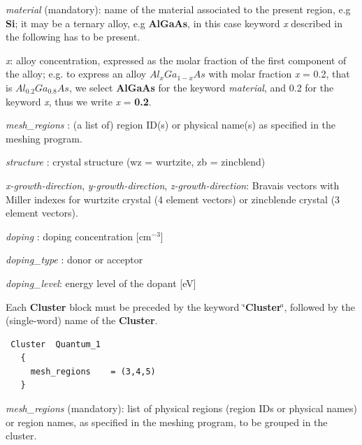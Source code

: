 

\textit{material} (mandatory):  name  of the  material associated to the  present region, e.g \textbf{Si}; it  may be  a ternary   alloy, e.g \textbf{AlGaAs},  in this  case keyword \textit{x } described in the  following has to be  present.

\textit{x}: alloy concentration, expressed as the  molar fraction of the first component of the alloy; e.g. to express an alloy $Al_xGa_{1-x}As$ with molar fraction \textit{x} = 0.2,  that is $Al_{0.2}Ga_{0.8}As$,  we select \textbf{AlGaAs} for the  keyword \textit{material}, and 0.2 for the keyword \textit{x}, thus we write \textit{x} = \textbf{0.2}.


\textit{ mesh\_regions }: (a list of) region ID(s) or  physical name(s)  as  specified in the meshing  program.


\textit{structure} : crystal structure (wz = wurtzite,  zb =  zincblend)

\textit{x-growth-direction}, \textit{y-growth-direction}, \textit{z-growth-direction}: Bravais  vectors with Miller  indexes for  wurtzite crystal (4 element vectors) or zincblende crystal  (3 element vectors).

\textit{doping} : doping  concentration [cm$^{-3}$]

\textit{doping\_type} : donor or  acceptor

\textit{doping\_level}: energy level of  the dopant [eV]




\bigskip

Each  \textbf{Cluster} block must be preceded by the keyword \char`\"{}\textbf{Cluster}\char`\"{}, followed by the  (single-word) name 
of the  \textbf{Cluster}.
 \begin{verbatim}
 Cluster  Quantum_1
   {
     mesh_regions    = (3,4,5)
   }
\end{verbatim}
\textit{mesh\_regions} (mandatory): list of physical regions (region IDs or  physical names) or \TiberCAD{} region names,  as  specified in the meshing  program,
to  be  grouped in the  cluster.


